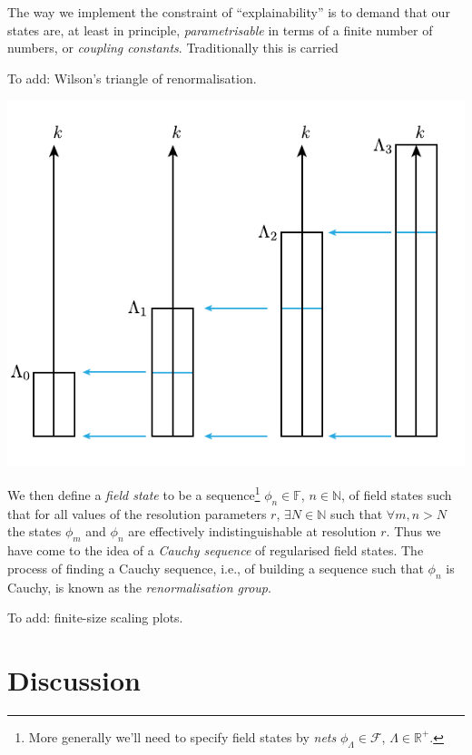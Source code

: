\documentclass[11pt]{amsart}
\theoremstyle{plain}%
\theoremstyle{definition}
\theoremstyle{remark}
\begin{document}
The way we implement the constraint of ``explainability'' is to demand that our states are, at least in principle, \emph{parametrisable} in terms of a finite number of numbers, or \emph{coupling constants}. Traditionally this is carried 


To add: Wilson's triangle of renormalisation.

\begin{center}
\includegraphics{rginverse.pdf}
\end{center}



We then define a \emph{field state} to be a sequence\footnote{More generally we'll need to specify field states by \emph{nets} $\phi_\Lambda \in \mathcal{F}$, $\Lambda\in\mathbb{R}^+$.} $\phi_n\in\mathbb{F}$, $n\in\mathbb{N}$, of field states such that for all values of the resolution parameters $r$, $\exists N\in \mathbb{N}$ such that $\forall m,n > N$ the states $\phi_m$ and $\phi_n$ are effectively indistinguishable at resolution $r$. Thus we have come to the idea of a \emph{Cauchy sequence} of regularised field states. The process of finding a Cauchy sequence, i.e., of building a sequence such that $\phi_n$ is Cauchy, is known as the \emph{renormalisation group}.


To add: finite-size scaling plots.


\section{Discussion}\label{sec:discussion}






\end{document}

